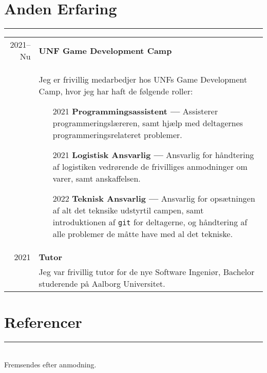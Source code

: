 \documentclass{article}
\begin{document}
\section*{Anden Erfaring}
\hrule width5cm
\begin{longtabu} to \textwidth {r|X}
2021--Nu & \textbf{UNF Game Development Camp}\\
&   Jeg er frivillig medarbedjer hos UNFs Game Development Camp, hvor jeg har haft de følgende roller:
    \begin{itemize}\setlength\itemsep{0em}
        \item[2021] \textbf{Programmingsassistent ---} Assisterer programmeringslæreren, samt
            hjælp med deltagernes programmeringsrelateret problemer.
        \item[2021] \textbf{Logistisk Ansvarlig ---} Ansvarlig for håndtering af logistiken
            vedrørende de frivilliges anmodninger om varer, samt anskaffelsen.
        \item[2022] \textbf{Teknisk Ansvarlig ---} Ansvarlig for opsætningen af alt det teknsike
            udstyrtil campen, samt introduktionen af \texttt{git} for deltagerne, og håndtering
            af alle problemer de måtte have med al det tekniske.
    \end{itemize}\\
2021 & \textbf{Tutor}\\
&   Jeg var frivillig tutor for de nye Software Ingeniør, Bachelor studerende på Aalborg Universitet.
\end{longtabu}

\section*{Referencer}
\hrule width5cm \ \\
Fremsendes efter anmodning.
\end{document}

